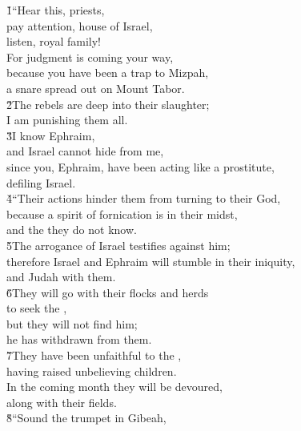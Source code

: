 \begin{poetry}
\poeml {}
\v{1}``Hear this, priests, \\
\poemll    pay attention, house of Israel, \\
\poemlll       listen, royal family! \\
\poeml For judgment is coming your way, \\
\poemll    because you have been a trap to Mizpah, \\
\poemlll       a snare spread out on Mount Tabor. \\
\poeml \v{2}The rebels are deep into their slaughter; \\
\poemll    I am punishing them all. \\
\poeml \v{3}I know Ephraim, \\
\poemll    and Israel cannot hide from me, \\
\poeml since you, Ephraim, have been acting like a prostitute, \\
\poemll    defiling Israel. \\
\poeml \v{4}``Their actions hinder them from turning to their God, \\
\poemll    because a spirit of fornication is in their midst, \\
\poemlll       and the  they do not know. \\
\poeml \v{5}The arrogance of Israel testifies against him; \\
\poemll    therefore Israel and Ephraim will stumble in their iniquity, \\
\poemlll       and Judah with them. \\
\poeml \v{6}They will go with their flocks and herds \\
\poemll    to seek the , \\
\poeml but they will not find him; \\
\poemll    he has withdrawn from them. \\
\poeml \v{7}They have been unfaithful to the , \\
\poemll    having raised unbelieving children. \\
\poeml In the coming month they will be devoured, \\
\poemll    along with their fields. \\
\poeml \v{8}``Sound the trumpet in Gibeah, \\

\end{poetry}
